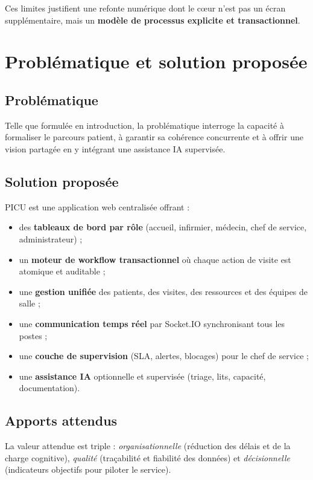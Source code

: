 Ces limites justifient une refonte numérique dont le cœur n'est pas un écran supplémentaire, mais un \textbf{modèle de processus explicite et transactionnel}.

\section{Problématique et solution proposée}

\subsection{Problématique}

Telle que formulée en introduction, la problématique interroge la capacité à formaliser le parcours patient, à garantir sa cohérence concurrente et à offrir une vision partagée en y intégrant une assistance IA supervisée.

\subsection{Solution proposée}

PICU est une application web centralisée offrant :

\begin{itemize}
    \item des \textbf{tableaux de bord par rôle} (accueil, infirmier, médecin, chef de service, administrateur) ;
    \item un \textbf{moteur de workflow transactionnel} où chaque action de visite est atomique et auditable ;
    \item une \textbf{gestion unifiée} des patients, des visites, des ressources et des équipes de salle ;
    \item une \textbf{communication temps réel} par Socket.IO synchronisant tous les postes ;
    \item une \textbf{couche de supervision} (SLA, alertes, blocages) pour le chef de service ;
    \item une \textbf{assistance IA} optionnelle et supervisée (triage, lits, capacité, documentation).
\end{itemize}

\subsection{Apports attendus}

La valeur attendue est triple : \textit{organisationnelle} (réduction des délais et de la charge cognitive), \textit{qualité} (traçabilité et fiabilité des données) et \textit{décisionnelle} (indicateurs objectifs pour piloter le service).

